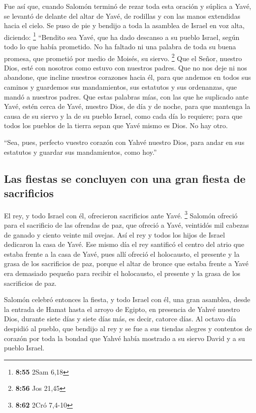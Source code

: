 \begin{paracol}{2}
 Fue así que, cuando Salomón terminó de rezar toda esta
oración y súplica a Yavé, se levantó de delante del altar de Yavé, de
rodillas y con las manos extendidas hacia el cielo.  Se
puso de pie y bendijo a toda la asamblea de Israel en voz alta,
diciendo: \footnote{\textbf{8:55} 2Sam 6,18}  ``Bendito
sea Yavé, que ha dado descanso a su pueblo Israel, según todo lo que
había prometido. No ha faltado ni una palabra de toda su buena promesa,
que prometió por medio de Moisés, su siervo. \footnote{\textbf{8:56} Jos
  21,45}  Que el Señor, nuestro Dios, esté con nosotros
como estuvo con nuestros padres. Que no nos deje ni nos abandone,
 que incline nuestros corazones hacia él, para que
andemos en todos sus caminos y guardemos sus mandamientos, sus estatutos
y sus ordenanzas, que mandó a nuestros padres.  Que estas
palabras mías, con las que he suplicado ante Yavé, estén cerca de Yavé,
nuestro Dios, de día y de noche, para que mantenga la causa de su siervo
y la de su pueblo Israel, como cada día lo requiere; 
para que todos los pueblos de la tierra sepan que Yavé mismo es Dios. No
hay otro.

 ``Sea, pues, perfecto vuestro corazón con Yahvé nuestro
Dios, para andar en sus estatutos y guardar sus mandamientos, como
hoy.''

\hypertarget{las-fiestas-se-concluyen-con-una-gran-fiesta-de-sacrificios}{%
\subsection{Las fiestas se concluyen con una gran fiesta de
sacrificios}\label{las-fiestas-se-concluyen-con-una-gran-fiesta-de-sacrificios}}

 El rey, y todo Israel con él, ofrecieron sacrificios
ante Yavé. \footnote{\textbf{8:62} 2Cró 7,4-10}  Salomón
ofreció para el sacrificio de las ofrendas de paz, que ofreció a Yavé,
veintidós mil cabezas de ganado y ciento veinte mil ovejas. Así el rey y
todos los hijos de Israel dedicaron la casa de Yavé.  Ese
mismo día el rey santificó el centro del atrio que estaba frente a la
casa de Yavé, pues allí ofreció el holocausto, el presente y la grasa de
los sacrificios de paz, porque el altar de bronce que estaba frente a
Yavé era demasiado pequeño para recibir el holocausto, el presente y la
grasa de los sacrificios de paz.

 Salomón celebró entonces la fiesta, y todo Israel con
él, una gran asamblea, desde la entrada de Hamat hasta el arroyo de
Egipto, en presencia de Yahvé nuestro Dios, durante siete días y siete
días más, es decir, catorce días.  Al octavo día despidió
al pueblo, que bendijo al rey y se fue a sus tiendas alegres y contentos
de corazón por toda la bondad que Yahvé había mostrado a su siervo David
y a su pueblo Israel.


\end{paracol}
